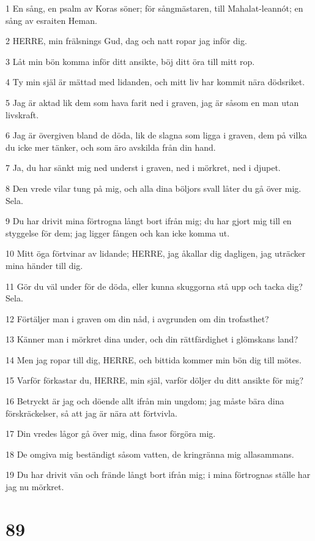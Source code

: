 \par 1 En sång, en psalm av Koras söner; för sångmästaren, till Mahalat-leannót; en sång av esraiten Heman.
\par 2 HERRE, min frälsnings Gud, dag och natt ropar jag inför dig.
\par 3 Låt min bön komma inför ditt ansikte, böj ditt öra till mitt rop.
\par 4 Ty min själ är mättad med lidanden, och mitt liv har kommit nära dödsriket.
\par 5 Jag är aktad lik dem som hava farit ned i graven, jag är såsom en man utan livskraft.
\par 6 Jag är övergiven bland de döda, lik de slagna som ligga i graven, dem på vilka du icke mer tänker, och som äro avskilda från din hand.
\par 7 Ja, du har sänkt mig ned underst i graven, ned i mörkret, ned i djupet.
\par 8 Den vrede vilar tung på mig, och alla dina böljors svall låter du gå över mig. Sela.
\par 9 Du har drivit mina förtrogna långt bort ifrån mig; du har gjort mig till en styggelse för dem; jag ligger fången och kan icke komma ut.
\par 10 Mitt öga förtvinar av lidande; HERRE, jag åkallar dig dagligen, jag uträcker mina händer till dig.
\par 11 Gör du väl under för de döda, eller kunna skuggorna stå upp och tacka dig? Sela.
\par 12 Förtäljer man i graven om din nåd, i avgrunden om din trofasthet?
\par 13 Känner man i mörkret dina under, och din rättfärdighet i glömskans land?
\par 14 Men jag ropar till dig, HERRE, och bittida kommer min bön dig till mötes.
\par 15 Varför förkastar du, HERRE, min själ, varför döljer du ditt ansikte för mig?
\par 16 Betryckt är jag och döende allt ifrån min ungdom; jag måste bära dina förskräckelser, så att jag är nära att förtvivla.
\par 17 Din vredes lågor gå över mig, dina fasor förgöra mig.
\par 18 De omgiva mig beständigt såsom vatten, de kringränna mig allasammans.
\par 19 Du har drivit vän och frände långt bort ifrån mig; i mina förtrognas ställe har jag nu mörkret.

\chapter{89}

